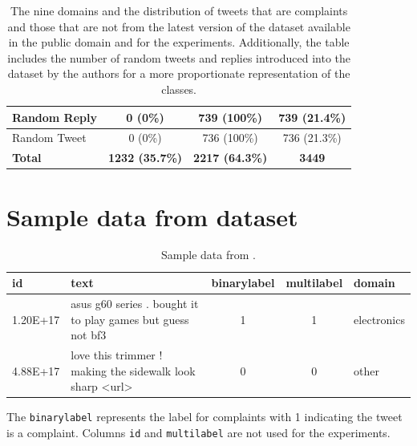 \begin{table}[ht]
\begin{tabularx}{\textwidth}{|X|c|c|c|}
        \hline
        \hline
        Random Reply                & 0 \small{(0\%)}                & 739 \small{(100\%)}            & 739 \small{(21.4\%)}  \\
        \hline
        Random Tweet                & 0 \small{(0\%)}                & 736 \small{(100\%)}            & 736 \small{(21.3\%)}  \\
        \hline
        \hline
        \rowcolor[gray]{0.9}
        \textbf{Total}              & \textbf{1232 \small{(35.7\%)}} & \textbf{2217 \small{(64.3\%)}} & \textbf{3449}         \\
        \hline
    \end{tabularx}
    \caption{The nine domains and the distribution of tweets that are complaints and those that are not from the latest version of the dataset available in the public domain and for the experiments. Additionally, the table includes the number of random tweets and replies introduced into the dataset by the authors for a more proportionate representation of the classes.}
    \label{tab: fulldataset_breakdown}
\end{table}

\section{Sample data from dataset}
\begin{table}[ht]
    \captionsetup{font=small}
    \small
    \centering
    \begin{tabularx}{\textwidth}{|l|X|c|c|l|}
        \hline
        \rowcolor[gray]{0.7}
        \textbf{id} & \textbf{text}                                               & \textbf{binarylabel} & \textbf{multilabel} & \textbf{domain} \\
        \hline
        1.20E+17    & asus g60 series . bought it to play games but guess not bf3 & 1                    & 1                   & electronics     \\
        \hline
        4.88E+17    & love this trimmer ! making the sidewalk look sharp <url>    & 0                    & 0                   & other           \\
        \hline
    \end{tabularx}
    \caption{Sample data from \cite{jinModelingSeverityComplaints2021}.}
    \label{tab: apdx_sample_data}
\end{table}

The \texttt{binarylabel} represents the label for complaints with 1 indicating the tweet is a complaint. Columns \texttt{id} and \texttt{multilabel} are not used for the experiments.



